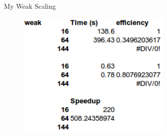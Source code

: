 \documentclass{beamer}
\begin{document}
\begin{frame}{My Weak Scaling}

  \begin{figure}[h!]
    \begin{center}
      \includegraphics[width=3in]{my_weak.png}
    \end{center}
  \end{figure}

\end{frame}

\end{document}
